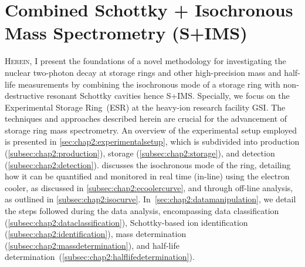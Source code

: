 
\chapter{Combined Schottky + Isochronous Mass Spectrometry (\textsc{S+IMS})}\label{chap:chap2:methodology}
\lettrine{H}{erein}, I present the foundations of a novel methodology for investigating the nuclear two-photon decay at storage rings and other high-precision mass and half-life measurements by combining the isochronous mode of a storage ring with non-destructive resonant Schottky cavities hence \textsc{S+IMS}. Specially, we focus on the Experimental Storage Ring~(\textsc{ESR}) at the heavy-ion research facility \textsc{GSI}. The techniques and approaches described herein are crucial for the advancement of storage ring mass spectrometry.
\newpar 
An overview of the experimental setup employed is presented in \cref{sec:chap2:experimentalsetup}, which is subdivided into production (\cref{subsec:chap2:production}), storage (\cref{subsec:chap2:storage}), and detection (\cref{subsec:chap2:detection}). 
 discusses the isochronous mode of the ring, detailing how it can be quantified and monitored in real time (in-line) using the electron cooler, as discussed in \cref{subsec:chap2:ecoolercurve}, and through off-line analysis, as outlined in \cref{subsec:chap2:isocurve}.
In~\cref{sec:chap2:datamanipulation}, we detail the steps followed during the data analysis, encompassing data classification (\cref{subsec:chap2:dataclassification}), Schottky-based ion identification (\cref{subsec:chap2:identification}), mass determination (\cref{subsec:chap2:massdetermination}), and half-life determination~(\cref{subsec:chap2:halflifedetermination}).

